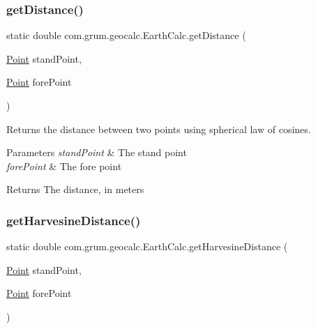 \subsubsection{\texorpdfstring{get\+Distance()}{getDistance()}}
{\footnotesize\ttfamily static double com.\+grum.\+geocalc.\+Earth\+Calc.\+get\+Distance (\begin{DoxyParamCaption}\item[{\mbox{\hyperlink{classcom_1_1grum_1_1geocalc_1_1_point}{Point}}}]{stand\+Point,  }\item[{\mbox{\hyperlink{classcom_1_1grum_1_1geocalc_1_1_point}{Point}}}]{fore\+Point }\end{DoxyParamCaption})\hspace{0.3cm}{\ttfamily [static]}}

Returns the distance between two points using spherical law of cosines.


\begin{DoxyParams}{Parameters}
{\em stand\+Point} & The stand point \\
\hline
{\em fore\+Point} & The fore point \\
\hline
\end{DoxyParams}
\begin{DoxyReturn}{Returns}
The distance, in meters 
\end{DoxyReturn}
\mbox{\label{classcom_1_1grum_1_1geocalc_1_1_earth_calc_a2ac0bcee0d65565480ff07854f1a98be}} 
\subsubsection{\texorpdfstring{get\+Harvesine\+Distance()}{getHarvesineDistance()}}
{\footnotesize\ttfamily static double com.\+grum.\+geocalc.\+Earth\+Calc.\+get\+Harvesine\+Distance (\begin{DoxyParamCaption}\item[{\mbox{\hyperlink{classcom_1_1grum_1_1geocalc_1_1_point}{Point}}}]{stand\+Point,  }\item[{\mbox{\hyperlink{classcom_1_1grum_1_1geocalc_1_1_point}{Point}}}]{fore\+Point }\end{DoxyParamCaption})\hspace{0.3cm}{\ttfamily [static]}}

